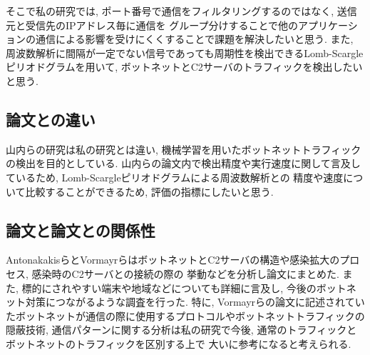 \documentclass[twocolumn,9]{ltjsarticle}
\begin{document}
そこで私の研究では, ポート番号で通信をフィルタリングするのではなく, 送信元と受信先のIPアドレス毎に通信を
グループ分けすることで他のアプリケーションの通信による影響を受けにくくすることで課題を解決したいと思う. 
また, 周波数解析に間隔が一定でない信号であっても周期性を検出できるLomb-Scargleピリオドグラムを用いて, 
ボットネットとC2サーバのトラフィックを検出したいと思う. 

\subsection{論文\cite{山内一将2015c}との違い}
山内らの研究は私の研究とは違い, 機械学習を用いたボットネットトラフィックの検出を目的としている. 
山内らの論文内で検出精度や実行速度に関して言及しているため, Lomb-Scargleピリオドグラムによる周波数解析との
精度や速度について比較することができるため, 評価の指標にしたいと思う. 

\subsection{論文\cite{antonakakis2017understanding}と論文\cite{vormayr2017botnet}との関係性}
AntonakakisらとVormayrらはボットネットとC2サーバの構造や感染拡大のプロセス, 感染時のC2サーバとの接続の際の
挙動などを分析し論文にまとめた. また, 標的にされやすい端末や地域などについても詳細に言及し, 
今後のボットネット対策につながるような調査を行った. 
特に, Vormayrらの論文に記述されていたボットネットが通信の際に使用するプロトコルやボットネットトラフィックの
隠蔽技術, 通信パターンに関する分析は私の研究で今後, 通常のトラフィックとボットネットのトラフィックを区別する上で
大いに参考になると考えられる. 



\end{document}
